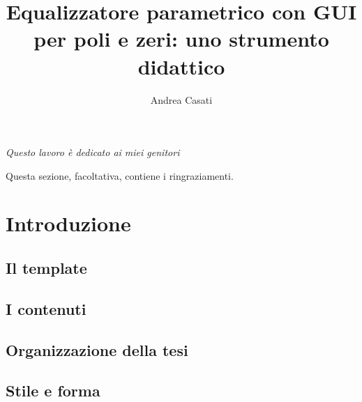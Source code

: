 \documentclass[12pt]{report}
\title{Equalizzatore parametrico con GUI per poli e zeri: uno strumento didattico}
\author{Andrea Casati}
\begin{document}
\makefrontpage

%
%

{\raggedleft \large \sl Questo lavoro \`{e} dedicato ai miei genitori\\}

\clearpage
\beforepreface

%
%


%
%

Questa sezione, facoltativa, contiene i ringraziamenti.

%
%

\afterpreface

%
%

\chapter{Introduzione}
\label{cap:introduzione}

\section{Il template}

\section{I contenuti}

\section{Organizzazione della tesi}

\section{Stile e forma}
\end{document}
